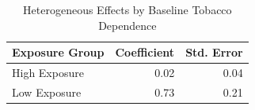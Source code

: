 \begin{table}[ht]
\centering
\begin{tabular}{lrr}
  \hline
Exposure Group & Coefficient & Std. Error \\ 
  \hline
High Exposure & 0.02 & 0.04 \\ 
  Low Exposure & 0.73 & 0.21 \\ 
   \hline
\end{tabular}
\caption{Heterogeneous Effects by Baseline Tobacco Dependence} 
\label{tab:heterogeneity}
\end{table}
